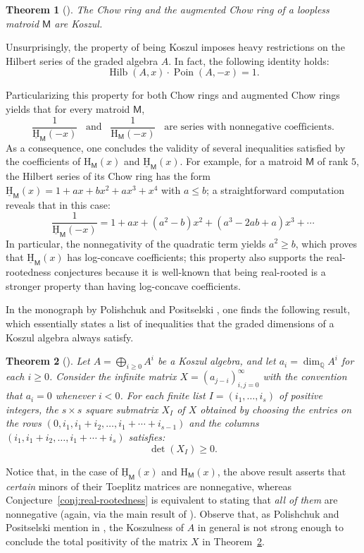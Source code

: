 \documentclass[11pt, a4paper, english]{amsart}
\theoremstyle{teoremas}
\newtheorem{theorem}{Theorem}[section]
\theoremstyle{definition}
\DeclareMathOperator{\Poin}{Poin}
\newcommand{\M}{\mathsf{M}}
\newcommand{\Hilb}{\operatorname{Hilb}}
\renewcommand{\H}{\mathrm{H}}
\newcommand{\uH}{\underline{\mathrm{H}}}
\begin{document}
\begin{theorem}[\cite{mastroeni-mccullough}]
    The Chow ring and the augmented Chow ring of a loopless matroid $\M$ are Koszul.
\end{theorem}

Unsurprisingly, the property of being Koszul imposes heavy restrictions on the Hilbert series of the graded algebra $A$. In fact, the following identity holds:
    \[ \Hilb(A, x) \cdot \Poin(A,-x) = 1.\]

Particularizing this property for both Chow rings and augmented Chow rings yields that for every matroid $\M$,
    \[ \frac{1}{\uH_{\M}(-x)}\enspace \text{ and }\enspace \frac{1}{\H_{\M}(-x)}\enspace \text{ are series with nonnegative coefficients}.\]
As a consequence, one concludes the validity of several inequalities satisfied by the coefficients of $\H_{\M}(x)$ and $\uH_{\M}(x)$. For example, for a matroid $\M$ of rank $5$, the Hilbert series of its Chow ring has the form $\uH_{\M}(x) = 1+ax+bx^2+ax^3+x^4$ with $a\leq b$; a straightforward computation reveals that in this case:
    \[ \frac{1}{\uH_{\M}(-x)} = 1 + ax + (a^2-b) x^2 + (a^3-2ab+a) x^3 + \cdots\]
In particular, the nonnegativity of the quadratic term yields $a^2\geq b$, which proves that $\uH_{\M}(x)$ has log-concave coefficients; this property also supports the real-rootedness conjectures because it is well-known that being real-rooted is a stronger property than having log-concave coefficients.

In the monograph by Polishchuk and Positselski \cite[Chapter~7]{polishchuk-positselski}, one finds the following result, which essentially states a list of inequalities that the graded dimensions of a Koszul algebra always satisfy. 

\begin{theorem}[{\cite[Chapter~7, Theorem~2.1]{polishchuk-positselski}}]\label{thm:polischuk}
    Let $A=\bigoplus_{i\geq 0} A^i$ be a Koszul algebra, and let $a_i = \dim_{\mathbb{Q}} A^i$ for each $i\geq 0$. Consider the infinite matrix $X = (a_{j-i})_{i,j=0}^{\infty}$ with the convention that $a_i = 0$ whenever $i<0$. For each finite list $I=(i_1,\ldots,i_s)$ of positive integers, the $s\times s$ square submatrix $X_I$ of $X$ obtained by choosing the entries on the rows $(0,i_1,i_1+i_2,\ldots, i_{1}+\cdots+i_{s-1})$ and the columns $(i_1,i_1+i_2,\ldots,i_1+\cdots+i_s)$ satisfies:
        \[ \det(X_I) \geq 0.\]
\end{theorem}

Notice that, in the case of $\uH_{\M}(x)$ and $\H_{\M}(x)$, the above result asserts that \emph{certain} minors of their Toeplitz matrices are nonnegative, whereas Conjecture~\ref{conj:real-rootedness} is equivalent to stating that \emph{all of them} are nonnegative (again, via the main result of \cite{aissen-schoenberg-whitney}). Observe that, as Polishchuk and Positselski mention in \cite[p.~137]{polishchuk-positselski}, the Koszulness of $A$ in general is not strong enough to conclude the total positivity of the matrix $X$ in Theorem~\ref{thm:polischuk}.
\end{document}
